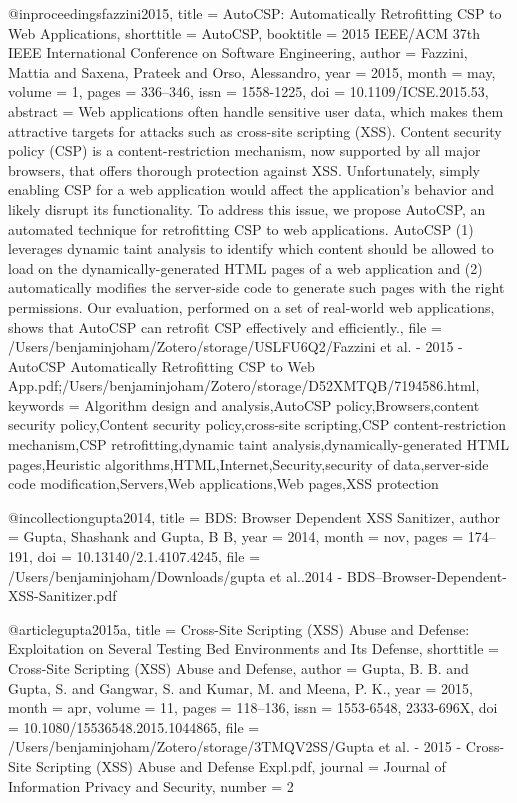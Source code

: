 @inproceedings{fazzini2015,
  title = {{{AutoCSP}}: {{Automatically Retrofitting CSP}} to {{Web Applications}}},
  shorttitle = {{{AutoCSP}}},
  booktitle = {2015 {{IEEE}}/{{ACM}} 37th {{IEEE International Conference}} on {{Software Engineering}}},
  author = {Fazzini, Mattia and Saxena, Prateek and Orso, Alessandro},
  year = {2015},
  month = may,
  volume = {1},
  pages = {336--346},
  issn = {1558-1225},
  doi = {10.1109/ICSE.2015.53},
  abstract = {Web applications often handle sensitive user data, which makes them attractive targets for attacks such as cross-site scripting (XSS). Content security policy (CSP) is a content-restriction mechanism, now supported by all major browsers, that offers thorough protection against XSS. Unfortunately, simply enabling CSP for a web application would affect the application's behavior and likely disrupt its functionality. To address this issue, we propose AutoCSP, an automated technique for retrofitting CSP to web applications. AutoCSP (1) leverages dynamic taint analysis to identify which content should be allowed to load on the dynamically-generated HTML pages of a web application and (2) automatically modifies the server-side code to generate such pages with the right permissions. Our evaluation, performed on a set of real-world web applications, shows that AutoCSP can retrofit CSP effectively and efficiently.},
  file = {/Users/benjaminjoham/Zotero/storage/USLFU6Q2/Fazzini et al. - 2015 - AutoCSP Automatically Retrofitting CSP to Web App.pdf;/Users/benjaminjoham/Zotero/storage/D52XMTQB/7194586.html},
  keywords = {Algorithm design and analysis,AutoCSP policy,Browsers,content security policy,Content security policy,cross-site scripting,CSP content-restriction mechanism,CSP retrofitting,dynamic taint analysis,dynamically-generated HTML pages,Heuristic algorithms,HTML,Internet,Security,security of data,server-side code modification,Servers,Web applications,Web pages,XSS protection}
}

@incollection{gupta2014,
  title = {{{BDS}}: {{Browser Dependent XSS Sanitizer}}},
  author = {Gupta, Shashank and Gupta, B B},
  year = {2014},
  month = nov,
  pages = {174--191},
  doi = {10.13140/2.1.4107.4245},
  file = {/Users/benjaminjoham/Downloads/gupta et al..2014 - BDS--Browser-Dependent-XSS-Sanitizer.pdf}
}

@article{gupta2015a,
  title = {Cross-{{Site Scripting}} ({{XSS}}) {{Abuse}} and {{Defense}}: {{Exploitation}} on {{Several Testing Bed Environments}} and {{Its Defense}}},
  shorttitle = {Cross-{{Site Scripting}} ({{XSS}}) {{Abuse}} and {{Defense}}},
  author = {Gupta, B. B. and Gupta, S. and Gangwar, S. and Kumar, M. and Meena, P. K.},
  year = {2015},
  month = apr,
  volume = {11},
  pages = {118--136},
  issn = {1553-6548, 2333-696X},
  doi = {10.1080/15536548.2015.1044865},
  file = {/Users/benjaminjoham/Zotero/storage/3TMQV2SS/Gupta et al. - 2015 - Cross-Site Scripting (XSS) Abuse and Defense Expl.pdf},
  journal = {Journal of Information Privacy and Security},
  number = {2}
}

